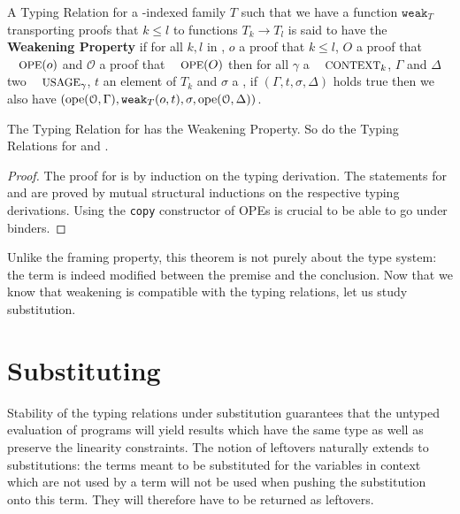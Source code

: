 \begin{definition}A Typing Relation \TR{\cdot} for a \Nat{}-indexed family $T$
such that we have a function $\texttt{weak}_T$ transporting proofs that
$k \ensuremath{\leq} l$ to functions $T_k → T_l$ is said to have the \textbf{Weakening Property}
if for all $k, l$ in \Nat{}, $o$ a proof that $k \ensuremath{\leq} l$, $O$ a proof that
$\OPE{}(o)$ and $\ensuremath{\mathcal{O}}$ a proof that $\OPE{}(O)$ then for all \ensuremath{\gamma} a $\Context{k}$,
\ensuremath{\Gamma} and \ensuremath{\Delta} two $\Usages{\ensuremath{\gamma}}$, $t$ an element of $T_k$ and \ensuremath{\sigma} a \Type{}, if
$(\ensuremath{\Gamma}, t, \ensuremath{\sigma}, \ensuremath{\Delta})$ holds true then we also have
$(\text{ope}(\mathcal{O}, \Gamma), \texttt{weak}_T(o, t), \sigma, \text{ope}(\mathcal{O}, \Delta))$.
\end{definition}

\begin{theorem}The Typing Relation for \Var{} has the Weakening Property.
So do the Typing Relations for \Inferable{} and \Checkable{}.
\end{theorem}
\begin{proof}
The proof for \Var{} is by induction on the typing derivation. The
statements for \Inferable{} and \Checkable{} are proved by mutual
structural inductions on the respective typing derivations. Using the
\texttt{copy} constructor of OPEs is crucial to be able to go under
binders.
\end{proof}

Unlike the framing property, this theorem is not purely about the
type system: the term is indeed modified between the premise and
the conclusion. Now that we know that weakening is compatible with
the typing relations, let us study substitution.


\section{Substituting}\label{sec:substitution}

Stability of the typing relations under substitution guarantees
that the untyped evaluation of programs will yield results which have
the same type as well as preserve the linearity constraints.
The notion of leftovers naturally extends to substitutions: the
terms meant to be substituted for the variables in context which
are not used by a term will not be used when pushing the substitution
onto this term. They will therefore have to be returned as leftovers.

